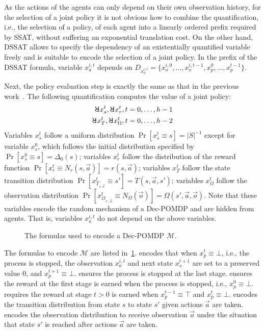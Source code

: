 As the actions of the agents can only depend on their own observation history, for the selection of a joint policy it is not obvious how to combine the quantification, i.e., the selection of a policy, of each agent into a linearly ordered prefix required by SSAT, without suffering an exponential translation cost.
On the other hand, DSSAT allows to specify the dependency of an existentially quantified variable freely and is suitable to encode the selection of a joint policy.
In the prefix of the DSSAT formula, variable $x_a^{i,t}$ depends on $D_{x_a^{i,t}}=\{x_o^{i,0},\ldots,x_o^{i,t-1},x_p^0,\ldots,x_p^{t-1}\}$.

Next, the policy evaluation step is exactly the same as that in the previous work~\cite{Salmon2020}.
The following quantification computes the value of a joint policy:
\begin{align*}
    \random{} x_s^t, \random{} x_r^t, t=0,\ldots,h-1 \\
    \random{} x_T^t, \random{} x_\Omega^t, t=0,\ldots,h-2
\end{align*}
Variables $x_s^t$ follow a uniform distribution $\Pr[x_s^t \equiv s]=|S|^{-1}$ except for variable $x_s^0$, which follows the initial distribution specified by $\Pr[x_s^0 \equiv s]=\Delta_0(s)$; variables $x_r^t$ follow the distribution of the reward function $\Pr[x_r^t \equiv N_r(s,\vec{a})]=r(s,\vec{a})$; variables $x_T^t$ follow the state transition distribution $\Pr[x_{T_{s,\vec{a}}}^t \equiv s']=T(s,\vec{a},s')$; variables $x_\Omega^t$ follow the observation distribution $\Pr[x_{\Omega_{s',\vec{a}}}^t \equiv N_\Omega(\vec{o})]=\Omega(s',\vec{a},\vec{o})$.
Note that these variables encode the random mechanism of a Dec-POMDP and are hidden from agents.
That is, variables $x_a^{i,t}$ do not depend on the above variables.

\begin{figure}[t]
    \centering
    
    \caption{The formulas used to encode a Dec-POMDP $\mathcal{M}$.}
    \label{fig:dssat-dec-pomdp-formula}
\end{figure}

The formulas to encode $\mathcal{M}$ are listed in~\cref{fig:dssat-dec-pomdp-formula}.
 encodes that when $x_p^t \equiv \bot$, i.e., the process is stopped, the observation $x_o^{i,t}$ and next state $x_s^{t+1}$ are set to a preserved value $0$, and $x_p^{t+1} \equiv \bot$.
 ensures the process is stopped at the last stage.
 ensures the reward at the first stage is earned when the process is stopped, i.e., $x_p^0 \equiv \bot$.
 requires the reward at stage $t>0$ is earned when $x_p^{t-1} \equiv \top$ and $x_p^t \equiv \bot$.
 encodes the transition distribution from state $s$ to state $s'$ given actions $\vec{a}$ are taken.
 encodes the observation distribution to receive observation $\vec{o}$ under the situation that state $s'$ is reached after actions $\vec{a}$ are taken.

